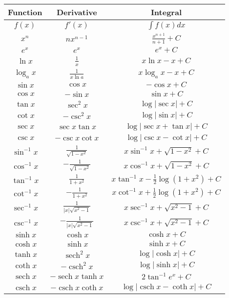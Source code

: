 \documentclass[12pt]{article}
\newcommand{\sech}{\operatorname{sech}}
\newcommand{\csch}{\operatorname{csch}}
\begin{document}
\begin{table}[h]
  \centering
  \renewcommand{\arraystretch}{2}
  \begin{tabular}{|c|c|c|}
    \hline
    Function & Derivative & Integral \\
    \hline
    $f(x)$ & $f'(x)$ & $\int f(x) dx$ \\
    \hline
    $x^n$ & $nx^{n-1}$ & $\frac{x^{n+1}}{n+1} + C$ \\
    $e^x$ & $e^x$ & $e^x + C$ \\
    $\ln x$ & $\frac{1}{x}$ & $x \ln x - x + C$ \\
    $\log_a x$ & $\frac{1}{x \ln a}$ & $x \log_a x - x + C$ \\
    \hline
    $\sin x$ & $\cos x$ & $-\cos x + C$ \\
    $\cos x$ & $-\sin x$ & $\sin x + C$ \\
    $\tan x$ & $\sec^2 x$ & $\log |\sec x| + C$ \\
    $\cot x$ & $-\csc^2 x$ & $\log |\sin x| + C$ \\
    $\sec x$ & $\sec x \tan x$ & $\log |\sec x + \tan x| + C$ \\
    $\csc x$ & $-\csc x \cot x$ & $\log |\csc x - \cot x| + C$ \\
    \hline
    $\sin^{-1} x$ & $\frac{1}{\sqrt{1-x^2}}$ & $x \sin^{-1} x + \sqrt{1-x^2} + C$ \\
    $\cos^{-1} x$ & $-\frac{1}{\sqrt{1-x^2}}$ & $x \cos^{-1} x + \sqrt{1-x^2} + C$ \\
    $\tan^{-1} x$ & $\frac{1}{1+x^2}$ & $x \tan^{-1} x - \frac{1}{2} \log(1+x^2) + C$ \\
    $\cot^{-1} x$ & $-\frac{1}{1+x^2}$ & $x \cot^{-1} x + \frac{1}{2} \log(1+x^2) + C$ \\
    $\sec^{-1} x$ & $\frac{1}{|x| \sqrt{x^2-1}}$ & $x \sec^{-1} x + \sqrt{x^2-1} + C$ \\
    $\csc^{-1} x$ & $-\frac{1}{|x| \sqrt{x^2-1}}$ & $x \csc^{-1} x + \sqrt{x^2-1} + C$ \\
    \hline
    $\sinh x$ & $\cosh x$ & $\cosh x + C$ \\
    $\cosh x$ & $\sinh x$ & $\sinh x + C$ \\
    $\tanh x$ & $\sech^2 x$ & $\log |\cosh x| + C$ \\
    $\coth x$ & $-\csch^2 x$ & $\log |\sinh x| + C$ \\
    $\sech x$ & $-\sech x \tanh x$ & $2 \tan^{-1}{e^x} + C$ \\
    $\csch x$ & $-\csch x \coth x$ & $\log |\csch x - \coth x| + C$ \\
    \hline
  \end{tabular}
\end{table}
\end{document}

